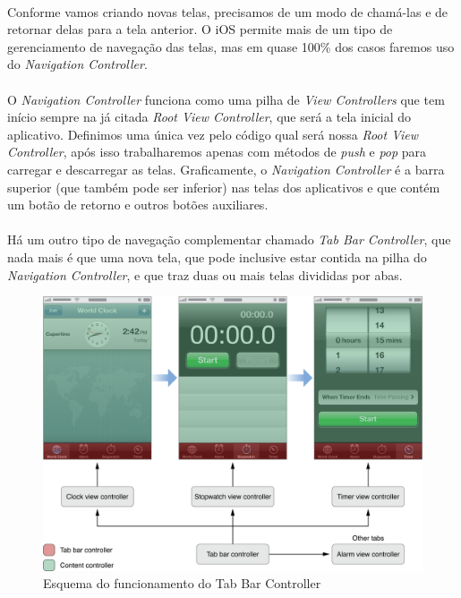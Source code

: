 \documentclass[a4paper,12pt,brazil,doubleside]{book}
\begin{document}
\bigskip

\paragraph{}Conforme vamos criando novas telas, precisamos de um modo de chamá-las e de retornar delas para a tela anterior. O iOS permite mais de um tipo de gerenciamento de navegação das telas, mas em quase 100\% dos casos faremos uso do \emph{Navigation Controller}.
\paragraph{}O \emph{Navigation Controller} funciona como uma pilha de \emph{View Controllers} que tem início sempre na já citada \emph{Root View Controller}, que será a tela inicial do aplicativo. Definimos uma única vez pelo código qual será nossa \emph{Root View Controller}, após isso trabalharemos apenas com métodos de \emph{push} e \emph{pop} para carregar e descarregar as telas. Graficamente, o \emph{Navigation Controller} é a barra superior (que também pode ser inferior) nas telas dos aplicativos e que contém um botão de retorno e outros botões auxiliares.
\paragraph{}Há um outro tipo de navegação complementar chamado \emph{Tab Bar Controller}, que nada mais é que uma nova tela, que pode inclusive estar contida na pilha do \emph{Navigation Controller}, e que traz duas ou mais telas divididas por abas.

\bigskip

\begin{figure}[h]
  \centering
  \includegraphics[totalheight=0.4\textheight]{../figuras/ios/apple_tabbar_interface.png}
  \caption{Esquema do funcionamento do Tab Bar Controller}
  \label{fig:a}
\end{figure}
\end{document}
